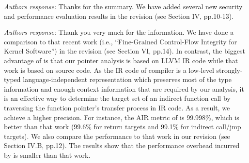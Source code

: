 \documentclass[oneside, 11pt]{article}
\begin{document}


\smallskip
\smallskip
\smallskip
{}

{\em Authors response:}
Thanks for the summary. We have added several new security and performance
evaluation results in the revision (see Section IV, pp.10-13).


\smallskip
\smallskip
\smallskip
{}

{\em Authors response:}
Thank you very much for the information. We have done a comparison to that
recent work (i.e., ``Fine-Grained Control-Flow Integrity for Kernel
Software'') in the revision (see Section VI, pp.14). In contrast, the biggest
advantage of \TheName{} is that our pointer analysis is based on LLVM IR code
while that work is based on source code. As the IR code of compiler is a
low-level strongly-typed language-independent representation which preserves
most of the type information and enough context information that are required
by our analysis, it is an effective way to determine the target set
of an indirect function call by traversing the function pointer's
transfer process in IR code. As a result, we achieve a higher precision.
For instance, the AIR metric of \TheName{} is 99.998\%, which is better than
that work (99.6\% for return targets and 99.1\% for indirect call/jmp
targets).
We also compare the performance to that work in our revision (see
Section IV.B, pp.12). The results show that the performance overhead
incurred by \TheName{} is smaller than that work.
\end{document}
